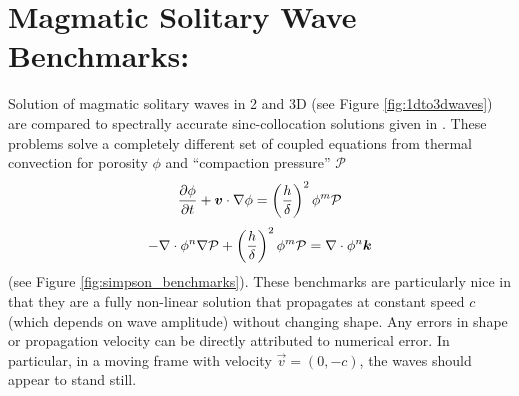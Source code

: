 %
%
%
%
%


\chapter{Magmatic Solitary Wave Benchmarks: \citeauthor{simpson_solitary_2011}} \label{sec:simpson} 

Solution of magmatic solitary waves in 2 and 3D (see Figure
\ref{fig:1dto3dwaves}) are compared to spectrally accurate sinc-collocation solutions given in \cite{simpson_solitary_2011}.  These problems solve a completely different set of coupled equations from thermal convection for porosity $\phi$ and ``compaction pressure'' $\mathcal{P}$ \begin{equation}
  \label{eq:15}
  \frac{\partial\phi}{\partial t} + {\mbox{\boldmath$v$}}\cdot\nabla\phi =
  \left(\frac{h}{\delta}\right)^{2} \phi^{m}\mathcal{P}
\end{equation}
\begin{equation}
  \label{eq:16}
  -\nabla\cdot\phi^n\nabla\mathcal{P} + \left(\frac{h}{\delta}\right)^{2} \phi^{m}\mathcal{P}=\nabla\cdot\phi^n{\mbox{\boldmath$k$}}
\end{equation}
(see Figure \ref{fig:simpson_benchmarks}).  These benchmarks are
particularly nice in that they are a fully non-linear solution that
propagates at constant speed $c$ (which depends on wave amplitude)
without changing shape. Any errors in shape or propagation velocity
can be directly attributed to numerical error.  In particular, in a
moving frame with velocity $\vec{v}= (0,-c)$, the waves should appear to
stand still.

